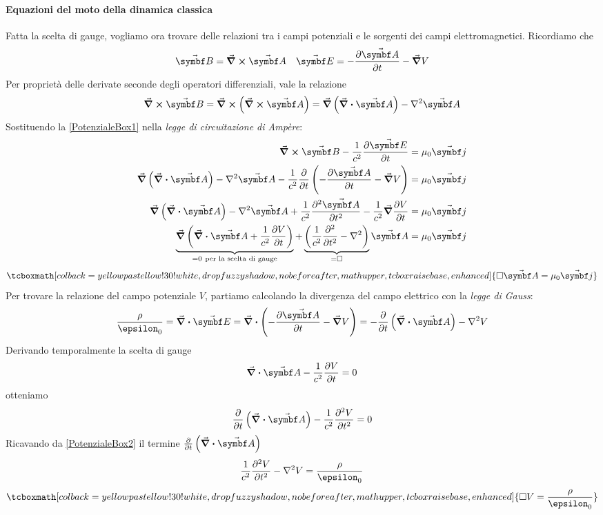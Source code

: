 \paragraph{Equazioni del moto della dinamica classica}
Fatta la scelta di gauge, vogliamo ora trovare delle relazioni tra i campi potenziali e le sorgenti dei campi elettromagnetici. Ricordiamo che
\begin{align*}
	\vba{B}=\curl{\vba{A}} && \vba{E}=-\pdv{\vba{A}}{t}-\grad{V}
\end{align*}
Per proprietà delle derivate seconde degli operatori differenziali, vale la relazione
\begin{equation}
	\curl{\vba{B}}=\curl{\left(\curl{\vba{A}}\right)}=\grad{\left(\div{\vba{A}}\right)}-\laplacian{\vba{A}}\label{PotenzialeBox1}
\end{equation}
Sostituendo la \eqref{PotenzialeBox1} nella \textit{legge di circuitazione di Ampère}:
\begin{align*}
	\curl{\vba{B}}-\frac{1}{c^2}\pdv{\vba{E}}{t}&=\mu_0\vba{j}\\
	\grad{\left(\div{\vba{A}}\right)}-\laplacian{\vba{A}}-\frac{1}{c^2}\pdv{t}\left(-\pdv{\vba{A}}{t}-\grad{V}\right)&=\mu_0\vba{j}\\
	\grad{\left(\div{\vba{A}}\right)}-\laplacian{\vba{A}}+\frac{1}{c^2}\pdv[2]{\vba{A}}{t}-\frac{1}{c^2}\grad{\pdv{V}{t}}&=\mu_0\vba{j}\\
	\underbrace{\grad{\left(\div{\vba{A}}+\frac{1}{c^2}\pdv{V}{t}\right)}}_{=0\ \text{per la scelta di gauge}}+\underbrace{\left(\frac{1}{c^2}\pdv[2]{t}-\laplacian\right)}_{=\Box}\vba{A}&=\mu_0\vba{j}
\end{align*}
\begin{equation}
	\tcboxmath[colback=yellowpastellow!30!white,drop fuzzy shadow, nobeforeafter, math upper, tcbox raise base, enhanced]{\Box{\vba{A}}=\mu_0\vba{j}}
\end{equation}
Per trovare la relazione del campo potenziale $V$, partiamo calcolando la divergenza del campo elettrico con la \textit{legge di Gauss}:
\begin{equation*}
	\frac{\rho}{\epsilon_0}=\div{\vba{E}}=\div{\left(-\pdv{\vba{A}}{t}-\grad{V}\right)}=-\pdv{t}\left(\div{\vba{A}}\right)-\laplacian{V}
\end{equation*}
Derivando temporalmente la scelta di gauge
\begin{equation*}
	\div{\vba{A}}-\frac{1}{c^2}\pdv{V}{t}=0
\end{equation*}
otteniamo
\begin{equation}
	\pdv{t}\left(\div{\vba{A}}\right)-\frac{1}{c^2}\pdv[2]{V}{t}=0 \label{PotenzialeBox2} 
\end{equation}
Ricavando da \eqref{PotenzialeBox2} il termine $\pdv{t}\left(\div{\vba{A}}\right)$
\begin{equation*}
	\frac{1}{c^2}\pdv[2]{V}{t}-\laplacian{V}=\frac{\rho}{\epsilon_0}
\end{equation*}
\begin{equation}
	\tcboxmath[colback=yellowpastellow!30!white,drop fuzzy shadow, nobeforeafter, math upper, tcbox raise base, enhanced]{\Box{V}=\frac{\rho}{\epsilon_0}}
\end{equation}